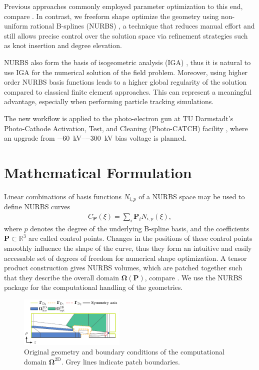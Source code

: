 \documentclass[journal, transmag]{IEEEtran}
\begin{document}
    Previous approaches commonly employed parameter optimization to this end, compare \cite{bazarov2005}. In contrast, we freeform shape optimize the geometry using non-uniform rational B-splines (NURBS) \cite{piegl1997}, a technique that reduces manual effort and still allows precise control over the solution space via refinement strategies such as knot insertion and degree elevation.

    NURBS also form the basis of isogeometric analysis (IGA) \cite{cottrell2009}, thus it is natural to use IGA for the numerical solution of the field problem. Moreover, using higher order NURBS basis functions leads to a higher global regularity of the solution compared to classical finite element approaches. This can represent a meaningful advantage, especially when performing particle tracking simulations.

    The new workflow is applied to the photo-electron gun at TU Darmstadt's Photo-Cathode Activation, Test, and Cleaning (Photo-CATCH) facility \cite{kurichiyanil2019}, where an upgrade from \SIrange{-60}{-300}{\kilo\volt} bias voltage is planned.

    \section{Mathematical Formulation}
    Linear combinations of basis functions $N_{i,p}$ of a NURBS space may be used to define NURBS curves
    \begin{align*}
        C_{\mathbf{P}}(\xi) = \sum_i \mathbf{P}_i N_{i,p}(\xi),
    \end{align*}
    where $p$ denotes the degree of the underlying B-spline basis, and the coefficients $\mathbf{P} \subset \mathbb{R}^3$ are called control points. Changes in the positions of these control points smoothly influence the shape of the curve, thus they form an intuitive and easily accessable set of degrees of freedom for numerical shape optimization. A tensor product construction gives NURBS volumes, which are patched together such that they describe the overall domain $\boldsymbol{\Omega}(\mathbf{P})$, compare \cite{buffa2015}. We use the NURBS package \cite{spink2017} for the computational handling of the geometries.

    \begin{figure}
        \begin{center}
        \includegraphics[width=0.45\textwidth]{geometry_original}
        \caption{Original geometry and boundary conditions of the computational domain $\boldsymbol{\Omega}^{\mathrm{2D}}$. Grey lines indicate patch boundaries.}
        \label{fig:geometry_original}
        \end{center}
    \end{figure}
\end{document}
